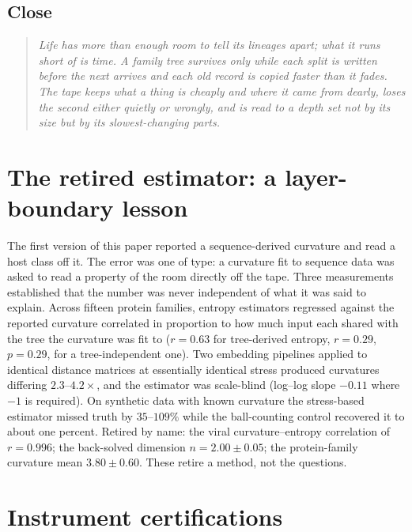 \documentclass[11pt]{article}
\begin{document}
\subsection*{Close}
\begin{quote}\itshape
Life has more than enough room to tell its lineages apart; what it runs short of is time. A family tree survives only while each split is written before the next arrives and each old record is copied faster than it fades. The tape keeps what a thing is cheaply and where it came from dearly, loses the second either quietly or wrongly, and is read to a depth set not by its size but by its slowest-changing parts.
\end{quote}

\appendix
\section{The retired estimator: a layer-boundary lesson}

The first version of this paper reported a sequence-derived curvature and read a host class off it. The error was one of type: a curvature fit to sequence data was asked to read a property of the room directly off the tape. Three measurements established that the number was never independent of what it was said to explain. Across fifteen protein families, entropy estimators regressed against the reported curvature correlated in proportion to how much input each shared with the tree the curvature was fit to ($r=0.63$ for tree-derived entropy, $r=0.29$, $p=0.29$, for a tree-independent one). Two embedding pipelines applied to identical distance matrices at essentially identical stress produced curvatures differing $2.3$--$4.2\times$, and the estimator was scale-blind (log--log slope $-0.11$ where $-1$ is required). On synthetic data with known curvature the stress-based estimator missed truth by $35$--$109\%$ while the ball-counting control recovered it to about one percent. Retired by name: the viral curvature--entropy correlation of $r=0.996$; the back-solved dimension $n=2.00\pm0.05$; the protein-family curvature mean $3.80\pm0.60$. These retire a method, not the questions.

\section{Instrument certifications}
\end{document}
